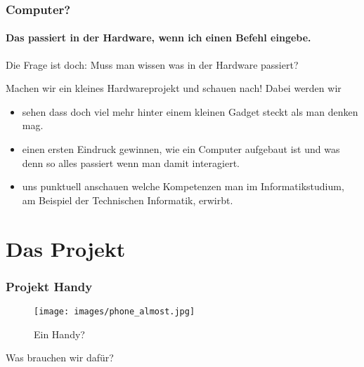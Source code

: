 \begin{frame}[allowframebreaks]
	\frametitle{Computer?}
	\framesubtitle{Das passiert in der Hardware, wenn ich einen Befehl
	eingebe.}

	\begin{block}{Die Frage ist doch:}
		Muss man wissen was in der Hardware passiert?
	\end{block}

	\framebreak

	\begin{block}{Machen wir ein kleines Hardwareprojekt und schauen nach!}
		Dabei werden wir
		\begin{itemize}
			\item sehen dass doch viel mehr hinter einem kleinen Gadget
				steckt als man denken mag.
			\item einen ersten Eindruck gewinnen, wie ein Computer aufgebaut ist und was denn so alles
				passiert wenn man damit interagiert.
			\item uns punktuell anschauen welche Kompetenzen man im Informatikstudium, am Beispiel
				der Technischen Informatik, erwirbt.
		\end{itemize}
	\end{block}
\end{frame}

\section{Das Projekt}
\begin{frame}
	\frametitle{Projekt Handy}


	\begin{figure}
		\centering
		\texttt{[image: images/phone\_almost.jpg]}
		\caption{Ein Handy?}
	\end{figure}

	\pause

	\begin{center}
		Was brauchen wir dafür?
	\end{center}
\end{frame}


